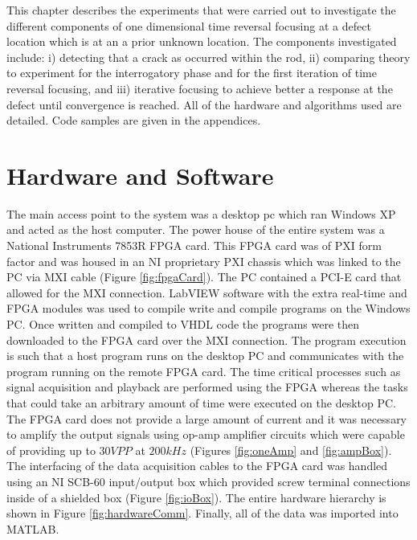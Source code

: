 
This chapter describes the experiments that were carried out to investigate the different components of one dimensional time reversal focusing at a defect location which is at an a prior unknown location. The components investigated include: i) detecting that a crack as occurred within the rod, ii) comparing theory to experiment for the interrogatory phase and for the first iteration of time reversal focusing, and iii) iterative focusing to achieve better a response at the defect until convergence is reached. All of the hardware and algorithms used are detailed. Code samples are given in the appendices.

\section{Hardware and Software}
The main access point to the system was a desktop pc which ran Windows XP and acted as the host computer. The power house of the entire system was a National Instruments 7853R FPGA card. This FPGA card was of PXI form factor and was housed in an NI proprietary PXI chassis which was linked to the PC via MXI cable (Figure \ref{fig:fpgaCard}). The PC contained a PCI-E card that allowed for the MXI connection. LabVIEW software with the extra real-time and FPGA modules was used to compile write and compile programs on the Windows PC. Once written and compiled to VHDL code the programs were then downloaded to the FPGA card over the MXI connection. The program execution is such that a host program runs on the desktop PC and communicates with the program running on the remote FPGA card. The time critical processes such as signal acquisition and playback are performed using the FPGA whereas the tasks that could take an arbitrary amount of time were executed on the desktop PC. The FPGA card does not provide a large amount of current and it was necessary to amplify the output signals using op-amp amplifier circuits which were capable of providing up to $30 VPP$ at $200 kHz$ (Figures \ref{fig:oneAmp} and \ref{fig:ampBox}). The interfacing of the data acquisition cables to the FPGA card was handled using an NI SCB-60 input/output box which provided screw terminal connections inside of a shielded box (Figure \ref{fig:ioBox}). The entire hardware hierarchy is shown in Figure \ref{fig:hardwareComm}. Finally, all of the data was imported into MATLAB.

